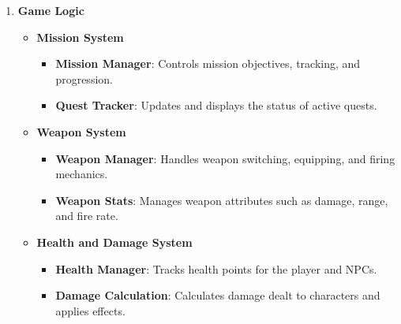 \begin{enumerate}
	\item \textbf{Game Logic}
	\begin{itemize}
		\item \textbf{Mission System}
		\begin{itemize}
			\item \textbf{Mission Manager}: Controls mission objectives, tracking, and progression.
			\item \textbf{Quest Tracker}: Updates and displays the status of active quests.
		\end{itemize}
		\item \textbf{Weapon System}
		\begin{itemize}
			\item \textbf{Weapon Manager}: Handles weapon switching, equipping, and firing mechanics.
			\item \textbf{Weapon Stats}: Manages weapon attributes such as damage, range, and fire rate.
		\end{itemize}
		\item \textbf{Health and Damage System}
		\begin{itemize}
			\item \textbf{Health Manager}: Tracks health points for the player and NPCs.
			\item \textbf{Damage Calculation}: Calculates damage dealt to characters and applies effects.
		\end{itemize}
	\end{itemize}
	

\end{enumerate}

